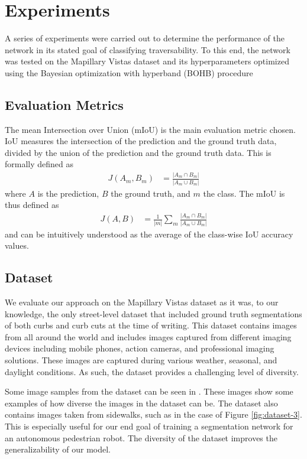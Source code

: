 \chapter{Experiments}\label{chap:experiments}
A series of experiments were carried out to determine the performance of the network in its stated goal of classifying traversability. To this end, the network was tested on the Mapillary Vistas dataset \cite{mapillary} and its hyperparameters optimized using the Bayesian optimization with hyperband (BOHB) procedure\cite{bohb}

\section{Evaluation Metrics} \label{section:experiments-evaluationmetrics}
The mean Intersection over Union (mIoU) is the main evaluation metric chosen.
IoU measures the intersection of the prediction and the ground truth data, divided by the union of the prediction and the ground truth data.
This is formally defined as
\begin{align}
	J(A_m,B_m) &= \frac{|A_m \cap B_m|}{|A_m \cup B_m|}
\end{align}
where $A$ is the prediction, $B$ the ground truth, and $m$ the class.
The mIoU is thus defined as
\begin{align}
	J(A,B) &= \frac{1}{|m|} \sum_{m}\frac{|A_m \cap B_m|}{|A_m \cup B_m|}
\end{align}
and can be intuitively understood as the average of the class-wise IoU accuracy values.

\section{Dataset} \label{section:experiments-dataset}
We evaluate our approach on the Mapillary Vistas dataset as it was, to our knowledge, the only street-level dataset that included ground truth segmentations of both curbs and curb cuts at the time of writing.
This dataset contains images from all around the world and includes images captured from different imaging devices including mobile phones, action cameras, and professional imaging solutions.
These images are captured during various weather, seasonal, and daylight conditions.
As such, the dataset provides a challenging level of diversity.

Some image samples from the dataset can be seen in .
These images show some examples of how diverse the images in the dataset can be.
The dataset also contains images taken from sidewalks, such as in the case of Figure \ref{fig:dataset-3}.
This is especially useful for our end goal of training a segmentation network for an autonomous pedestrian robot.
The diversity of the dataset improves the generalizability of our model.

